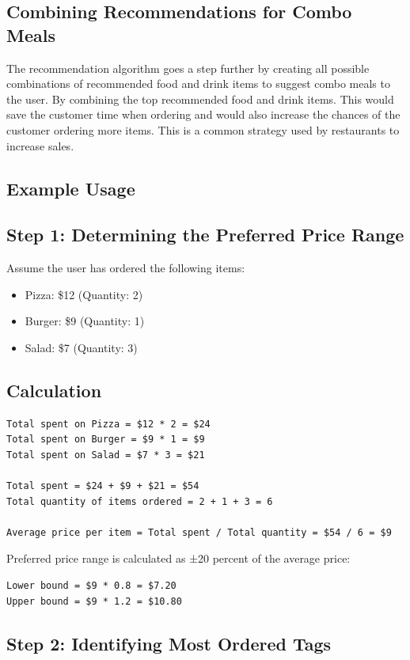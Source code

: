 \subsection{Combining Recommendations for Combo Meals}
The recommendation algorithm goes a step further by creating all possible combinations of recommended food and drink items to suggest combo meals to the user. By combining the top recommended food and drink items. This would save the customer time when ordering and would also increase the chances of the customer ordering more items. This is a common strategy used by restaurants to increase sales.

\subsection{Example Usage}
\subsection*{Step 1: Determining the Preferred Price Range}

Assume the user has ordered the following items:

\begin{itemize}
    \item Pizza: \$12 (Quantity: 2)
    \item Burger: \$9 (Quantity: 1)
    \item Salad: \$7 (Quantity: 3)
\end{itemize}

\subsection*{Calculation}

\begin{verbatim}
Total spent on Pizza = $12 * 2 = $24
Total spent on Burger = $9 * 1 = $9
Total spent on Salad = $7 * 3 = $21

Total spent = $24 + $9 + $21 = $54
Total quantity of items ordered = 2 + 1 + 3 = 6

Average price per item = Total spent / Total quantity = $54 / 6 = $9
\end{verbatim}

Preferred price range is calculated as ±20 percent of the average price:
\begin{verbatim}
Lower bound = $9 * 0.8 = $7.20
Upper bound = $9 * 1.2 = $10.80
\end{verbatim}

\subsection*{Step 2: Identifying Most Ordered Tags}


